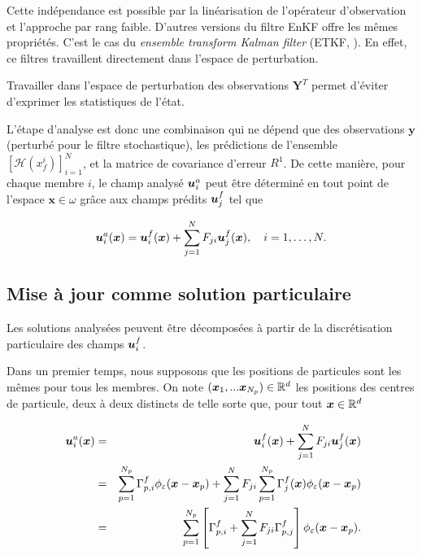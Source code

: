 Cette indépendance est possible par la linéarisation de l'opérateur d'observation et l'approche par rang faible. D'autres versions du filtre EnKF offre les mêmes propriétés. C'est le cas du \textit{ensemble transform Kalman filter} (ETKF, \cite{Hunt2007}). En effet, ce filtres travaillent directement dans l'espace de perturbation.

Travailler dans l'espace de perturbation des observations $\bm Y^T$ permet d'éviter d'exprimer les statistiques de l'état.

L'étape d'analyse est donc une combinaison qui ne dépend que des observations $\bm y$ (perturbé pour le filtre stochastique), les prédictions de l'ensemble $\left[\mathcal{H}(x^i_f)\right]_{i=1}^{N}$, et la matrice de covariance d'erreur $R^{1}$. De cette manière, pour chaque membre $i$, le champ analysé $\bm{u}_i^a$ peut être déterminé en tout point de l'espace $\bm x \in \omega$ grâce aux champs prédits $\bm{u}_j^f$ tel que

\begin{equation*}
    \bm{u}_i^a(\bm{x}) =\bm{u}_i^f(\bm{x}) + \sum_{j=1}^{N} F_{ji} \bm{u}_j ^f(\bm{x}), \quad i = 1, \dots, N.
\end{equation*}

\subsection{Mise à jour comme solution particulaire}

Les solutions analysées peuvent être décomposées à partir de la discrétisation particulaire des champs $\bm{u}_i^f$.

Dans un premier temps, nous supposons que les positions de particules sont les mêmes pour tous les membres. On note $(\bm{x}_1,...\bm{x}_{N_p}) \in \mathbb{R}^d$ les positions des centres de particule, deux à deux distincts de telle sorte que, pour tout $\bm{x} \in \mathbb{R}^d$

\begin{eqnarray*}~\label{eq:enkf_formula_same_part}
    \bm{u}_i^a(\bm{x}) &=& \bm{u}_i^f(\bm{x}) + \sum_{j=1}^{N} F_{ji} \bm{u}_j ^f(\bm{x}) \\
    &=& \sum_{p=1}^{N_p} \Gamma^f_{p,i} \phi_{\varepsilon}(\bm{x} - \bm{x}_p) + \sum_{j=1}^{N} F_{ji} \sum_{p=1}^{N_p} \Gamma_j ^f(\bm{x}) \phi_{\varepsilon}(\bm{x} - \bm{x}_p) \\
    &=& \sum_{p=1}^{N_p} \left[\Gamma^f_{p,i} + \sum_{j=1}^{N} F_{ji} \Gamma^f_{p,j} \right] \phi_{\varepsilon}(\bm{x} - \bm{x}_p).
\end{eqnarray*}

